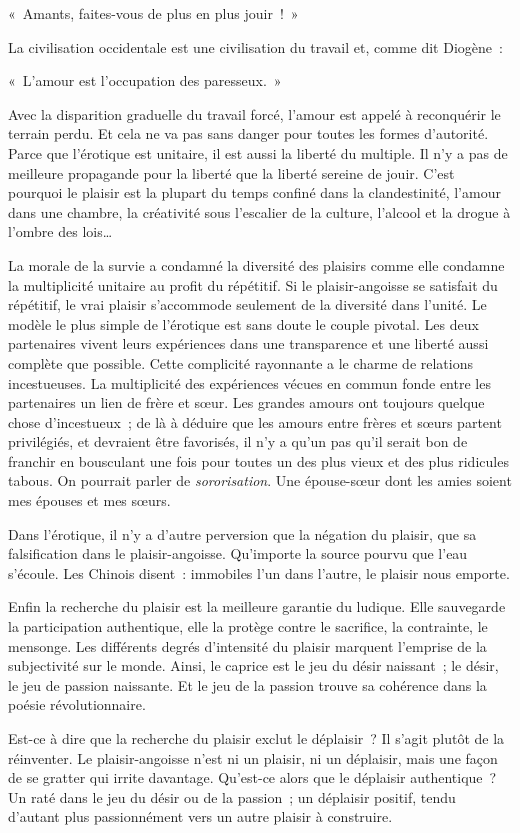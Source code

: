\documentclass[french,twoside]{book} %
\newenvironment{quoteblock}%
  {\begin{quoting}}
  {\end{quoting}}
\newenvironment{quotebar}{%
    \def\FrameCommand{{\color{rubric!10!}\vrule width 0.5em} \hspace{0.9em}}%
    \def\OuterFrameSep{\itemsep} %
    \MakeFramed {\advance\hsize-\width \FrameRestore}
  }%
  {%
    \endMakeFramed
  }
\renewenvironment{quoteblock}%
  {%
    \savenotes
    \setstretch{0.9}
    \normalfont
    \begin{quotebar}
  }
  {%
    \end{quotebar}
    \spewnotes
  }
\begin{document}
\begin{quoteblock}
\noindent « Amants, faites-vous de plus en plus jouir ! »\end{quoteblock}

\noindent La civilisation occidentale est une civilisation du travail et, comme dit Diogène :\par

\begin{quoteblock}
\noindent « L’amour est l’occupation des paresseux. »\end{quoteblock}

\noindent Avec la disparition graduelle du travail forcé, l’amour est appelé à reconquérir le terrain perdu. Et cela ne va pas sans danger pour toutes les formes d’autorité. Parce que l’érotique est unitaire, il est aussi la liberté du multiple. Il n’y a pas de meilleure propagande pour la liberté que la liberté sereine de jouir. C’est pourquoi le plaisir est la plupart du temps confiné dans la clandestinité, l’amour dans une chambre, la créativité sous l’escalier de la culture, l’alcool et la drogue à l’ombre des lois…\par
La morale de la survie a condamné la diversité des plaisirs comme elle condamne la multiplicité unitaire au profit du répétitif. Si le plaisir-angoisse se satisfait du répétitif, le vrai plaisir s’accommode seulement de la diversité dans l’unité. Le modèle le plus simple de l’érotique est sans doute le couple pivotal. Les deux partenaires vivent leurs expériences dans une transparence et une liberté aussi complète que possible. Cette complicité rayonnante a le charme de relations incestueuses. La multiplicité des expériences vécues en commun fonde entre les partenaires un lien de frère et sœur. Les grandes amours ont toujours quelque chose d’incestueux ; de là à déduire que les amours entre frères et sœurs partent privilégiés, et devraient être favorisés, il n’y a qu’un pas qu’il serait bon de franchir en bousculant une fois pour toutes un des plus vieux et des plus ridicules tabous. On pourrait parler de \emph{sororisation}. Une épouse-sœur dont les amies soient mes épouses et mes sœurs.\par
Dans l’érotique, il n’y a d’autre perversion que la négation du plaisir, que sa falsification dans le plaisir-angoisse. Qu’importe la source pourvu que l’eau s’écoule. Les Chinois disent : immobiles l’un dans l’autre, le plaisir nous emporte.\par
Enfin la recherche du plaisir est la meilleure garantie du ludique. Elle sauvegarde la participation authentique, elle la protège contre le sacrifice, la contrainte, le mensonge. Les différents degrés d’intensité du plaisir marquent l’emprise de la subjectivité sur le monde. Ainsi, le caprice est le jeu du désir naissant ; le désir, le jeu de passion naissante. Et le jeu de la passion trouve sa cohérence dans la poésie révolutionnaire.\par
Est-ce à dire que la recherche du plaisir exclut le déplaisir ? Il s’agit plutôt de la réinventer. Le plaisir-angoisse n’est ni un plaisir, ni un déplaisir, mais une façon de se gratter qui irrite davantage. Qu’est-ce alors que le déplaisir authentique ? Un raté dans le jeu du désir ou de la passion ; un déplaisir positif, tendu d’autant plus passionnément vers un autre plaisir à construire.
\end{document}
